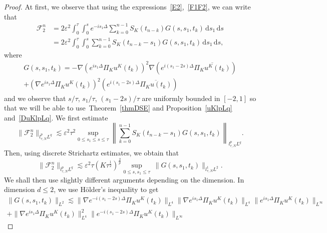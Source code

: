 \documentclass[10pt,a4paper]{article}
\begin{document}
  \begin{proof}
    At first, we observe that using the expressions~\eqref{E2},~\eqref{F1F2}, we can write that
    \begin{equation}%
      \begin{aligned}
        \mathcal F_2^n &= 2\varepsilon^2 \int_0^\tau \int_0^s e^{-is_1\Delta}
        \sum_{k=0}^{n-1} S_K(t_{n-k})  G(s,s_1,t_k)\,\mathrm{d}s_1\,\mathrm{d}s \\
        & = 2\varepsilon^2 \int_0^\tau \int_0^s \sum_{k=0}^{n-1}  S_K(t_{n-k}- s_1)
        G(s,s_1,t_k)\,\mathrm{d}s_1\,\mathrm{d}s,
      \end{aligned}
    \end{equation}
    where
    \begin{multline*}
      G(s,s_1,t_k) =  -\nabla\left( e^{is_1\Delta} \Pi_K u^K(t_k) \right)^2 
      \nabla \left( e^{i(s_1-2s)\Delta} \overline{\Pi_K u^K(t_k)} \right) \\
      + \left( \nabla e^{is_1\Delta} \Pi_K u^K(t_k) \right)^2 \left( e^{i(s_1-2s)\Delta} \overline{\Pi_K u(t_k)} \right)
    \end{multline*}
    and we observe that \(s/\tau\), \(s_1/\tau\), \((s_1- 2s)/\tau\) are uniformly
    bounded in \([-2, 1]\) so that we will be able to use~Theorem~\ref{thmDSE}
    and Proposition~\ref{uKlpLq} and~\ref{DuKlpLq}.
    We first estimate
    \begin{equation}%
      \|\mathcal F_2^n\|_{l^p_{\tau,N}L^q} \lesssim \varepsilon^2\tau^2  
      \sup_{0 \leq s_1 \leq s \leq \tau} \left\|\sum_{k=0}^{n-1}  S_K(t_{n-k}-s_1)
      G(s, s_1, t_k) \right\|_{l^p_{\tau, N}L^q}.
    \end{equation}
    Then, using  discrete Strichartz estimates, we obtain that
    \[ \| \mathcal F_{2}^n \|_{l^p_{\tau, N}L^{q}} \lesssim \varepsilon^2\tau
    (K \tau^\frac12)^\frac2p \sup_{0 \leq s, s_1 \leq \tau}\ \|G(s, s_1,
    t_k) \|_{l^1_{\tau, N} L^2}. 
    \]
    We shall then use slightly different arguments depending on the dimension.
    In dimension \(d \leq 2\), we use H\"older's inequality to get
    \begin{multline*}
      \|G(s,s_1,t_k)\|_{L^2} \lesssim  \|\nabla e^{-i(s_1-2s)\Delta}\Pi_{K}u^K(t_k)\|_{L^4} 
      \|\nabla e^{is_1\Delta} \Pi_{K}u^K(t_k)\|_{L^4}
      \|e^{is_1\Delta}\Pi_{K}u^K(t_k)\|_{L^\infty}  \\
      + \|\nabla e^{is_1\Delta}\Pi_{K}u^K(t_k)\|_{L^4}^2 \|e^{-i(s_1-2s)\Delta}\Pi_{K}u^K(t_k)\|_{L^\infty}
    \end{multline*}

\end{proof}
\end{document}
